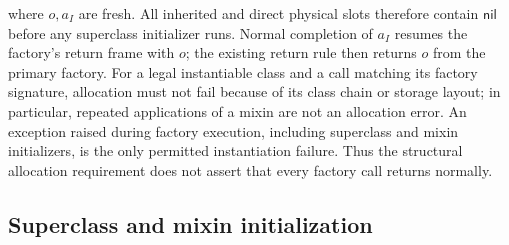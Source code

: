 \documentclass[11pt]{article}
\numberwithin{equation}{section}
\newcommand{\kw}[1]{\ensuremath{\mathsf{#1}}}
\newcommand{\nil}{\kw{nil}}
\begin{document}
where $o,a_I$ are fresh.  All inherited and direct physical slots therefore
contain $\nil$ before any superclass initializer runs.  Normal completion of
$a_I$ resumes the factory's return frame with $o$; the existing return rule then
returns $o$ from the primary factory.
For a legal instantiable class and a call matching its factory signature,
allocation must not fail because of its class chain or storage layout; in
particular, repeated applications of a mixin are not an allocation error.
An exception raised during factory execution, including superclass and mixin
initializers, is the only permitted instantiation failure.  Thus the
structural allocation requirement does not assert that every factory call
returns normally.

\subsection{Superclass and mixin initialization}
\end{document}
